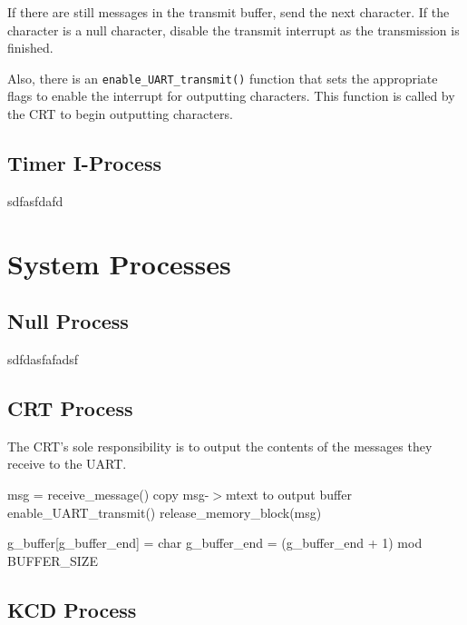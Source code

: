 \documentclass[12pt]{report}
\begin{document}
If there are still messages in the transmit buffer, send the next character. If the character is a null character, disable the transmit interrupt as the transmission is finished. 


Also, there is an \texttt{enable_UART_transmit()} function that sets the appropriate flags to enable the interrupt for outputting characters. This function is called by the CRT to begin outputting characters.


\subsection{Timer I-Process}

sdfasfdafd


\section{System Processes}

\subsection{Null Process}

sdfdasfafadsf

\subsection{CRT Process}

The CRT's sole responsibility is to output the contents of the messages they receive to the UART.

\begin{algorithmic}[1]
      \State msg = receive\_message()
      \State copy msg-$>$mtext to output buffer
      \State enable\_UART\_transmit() 
      \State release\_memory\_block(msg)
    \EndWhile
  \EndFunction
\end{algorithmic}

\begin{algorithmic}[1]
      \State g_buffer[g_buffer_end] = char
      \State g_buffer_end = (g_buffer_end + 1) mod BUFFER_SIZE
    \EndFor
  \EndFunction
\end{algorithmic}

\subsection{KCD Process}
\end{document}
